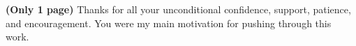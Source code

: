 \textbf{(Only 1 page)} Thanks for all your unconditional confidence, support, patience, and encouragement. You were my main motivation for pushing through this work.